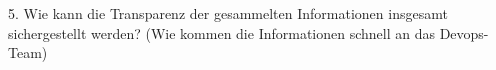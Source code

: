 

5. Wie kann die Transparenz der gesammelten Informationen insgesamt sichergestellt werden? (Wie kommen die Informationen schnell an das Devops-Team)\\ 

